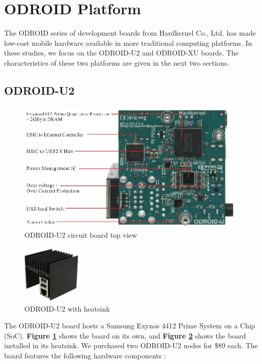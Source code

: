 \documentclass[11pt]{book}
\begin{document}
\section{\textbf{ODROID Platform}}

The ODROID series of development boards from Hardkernel Co., Ltd. has made
low-cost mobile hardware available in more traditional computing platforms. In
these studies, we focus on the ODROID-U2 and ODROID-XU boards. The
characteristics of these two platforms are given in the next two sections.

\subsection{\textbf{ODROID-U2}}

\begin{figure}[h]
\includegraphics[width=\textwidth]{odroid_u2_top}
\caption{ODROID-U2 circuit board top view \cite{odroid-u2-board-detail}}
\label{odroid-u2-board}
\end{figure}

\begin{figure}[h]
\centering
\includegraphics[width=0.25\textwidth]{odroid_u2}
\caption{ODROID-U2 with heatsink \cite{odroid-u2-board-detail}}
\label{odroid-u2}
\end{figure}

The ODROID-U2 board hosts a Samsung Exynos 4412 Prime System on a Chip
(SoC). \textbf{Figure \ref{odroid-u2-board}} shows the board on its own, and
\textbf{Figure \ref{odroid-u2}} shows the board installed in its heatsink. We
purchased two ODROID-U2 nodes for \$89 each. The board features the following
hardware components \cite{odroid-u2-board-detail}:
\end{document}
